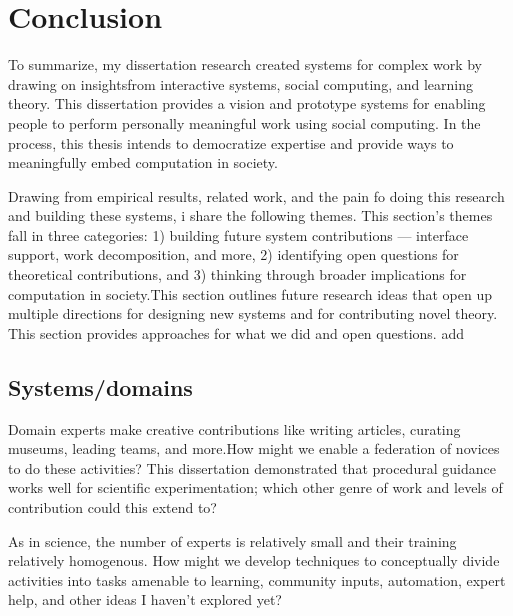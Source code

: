 
\chapter{Conclusion}

To summarize, my dissertation research created systems for complex work by drawing on insightsfrom interactive systems, social computing, and learning theory. This dissertation provides a vision and prototype systems for enabling people to perform personally meaningful work using social computing. In the process, this thesis intends to democratize expertise and provide ways to meaningfully embed computation in society. 

Drawing from empirical results, related work, and the pain fo doing this research and building these systems, i share the following themes. This section's themes fall in three categories: 1) building future system contributions — interface support, work decomposition, and more, 2) identifying open questions for theoretical contributions, and 3) thinking through broader implications for computation in society.This section outlines future research ideas that open up multiple directions for designing new systems and for contributing novel theory. This section provides approaches for what we did and open questions.
add

\section{Systems/domains} 


Domain experts make creative contributions like writing articles, curating museums, leading teams, and more.How might we enable a federation of novices to do these activities? This dissertation demonstrated that procedural guidance works well for scientific experimentation; which other genre of work and levels of contribution could this extend to? 

As in science, the number of experts is relatively small and their training relatively homogenous. How might we develop techniques to conceptually divide activities into tasks amenable to learning, community inputs, automation, expert help, and other ideas I haven’t explored yet?

